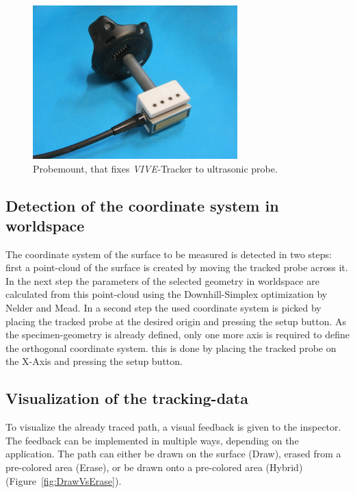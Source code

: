 \documentclass{VRARWorkshop}
\begin{document}
\begin{figure}[h!]
  \label{fig:probemount}
    \begin{center}
        \includegraphics[width=79mm]{images/probemount}
        \caption{\label{fig:probemount} Probemount, that fixes \textit{VIVE-}Tracker to ultrasonic probe.}
    \end{center}
\end{figure}

\subsection{Detection of the coordinate system in worldspace}
The coordinate system of the surface to be measured is detected in two steps:
first a point-cloud of the surface is created by moving the tracked probe across it.
In the next step the parameters of the selected geometry in worldspace are calculated from this point-cloud using the Downhill-Simplex optimization by Nelder and Mead.
In a second step the used coordinate system is picked by placing the tracked probe at the desired origin and pressing the setup button.
As the specimen-geometry is already defined, only one more axis is required to define the orthogonal coordinate system.
this is done by placing the tracked probe on the X-Axis and pressing the setup button.

\subsection{Visualization of the tracking-data}
\label{sec:DrawVsErase}
To visualize the already traced path, a visual feedback is given to the inspector.
The feedback can be implemented in multiple ways, depending on the application.
The path can either be drawn on the surface ({\sc Draw}), erased from a pre-colored area ({\sc Erase}), or be drawn onto a pre-colored area ({\sc Hybrid}) (Figure~\ref{fig:DrawVsErase}).
\end{document}
